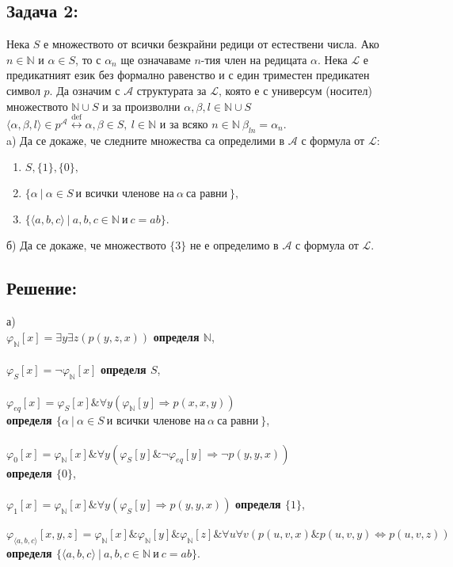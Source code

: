 \documentclass[french]{article}
\begin{document}
\subsection*{{\Large Задача 2:}} 
	{\Large 
	Нека $S$ е множеството от всички безкрайни редици от естествени числа. Ако $n \in \mathbb{N}$ и $\alpha \in S$, то с $\alpha_n$ ще означаваме $n$-тия член на редицата $\alpha$. Нека $\mathcal{L}$ е предикатният език без формално равенство и с един триместен предикатен символ $p$. Да означим с $\mathcal{A}$ структурата за $\mathcal{L}$, която е с универсум (носител) множеството $\mathbb{N} \cup S$ и за произволни $\alpha,\beta, l \in \mathbb{N} \cup S$ \\
	$ \langle \alpha,\beta, l \rangle \in p^{\mathcal{A}} \stackrel{\mathrm{def}}{\longleftrightarrow} \alpha, \beta \in S,\ l \in \mathbb{N} $ и за всяко $ n \in \mathbb{N}\ \beta_{ln} = \alpha_n. $ \\
	a) Да се докаже, че следните множества са определими в $\mathcal{A}$ с формула от $\mathcal{L}$: 
	\begin{enumerate}
		\item $ S, \{1\},\{0\}, $
		\item $ \{\alpha\ |\ \alpha \in S\ \text{и всички членове на}\ \alpha\ \text{са равни}\ \}, $
		\item $ \{ \langle a,b,c \rangle\ |\ a,b,c \in \mathbb{N}\ \text{и}\ c=ab \}. $	
	\end{enumerate}
	б) Да се докаже, че множеството $\{3\}$ не е определимо в $\mathcal{A}$ с
	формула от $\mathcal{L}$.


	\subsection*{{\Large Решение:}}
		а) \\
		$\varphi_{\mathbb{N}}[x] = \exists y \exists z (p(y,z,x))$ \textbf{определя $\mathbb{N}$}, \\
		\\
		$\varphi_S[x] = \neg \varphi_{\mathbb{N}}[x]$ 
		\textbf{определя $S$}, \\
		\\
		$\varphi_{eq}[x] = \varphi_S[x] \& \forall y (\varphi_{\mathbb{N}}[y] \Rightarrow p(x,x,y))$ \\ 
		\textbf{определя $\{\alpha\ |\ \alpha \in S\ \text{и всички членове на}\ \alpha\ \text{са равни}\ \}$}, \\
		\\
		$\varphi_0[x] = \varphi_{\mathbb{N}}[x] \& \forall y (\varphi_S[y] \& \neg \varphi_{eq}[y] \Rightarrow \neg p(y,y,x))$ \\ 
		\textbf{определя $\{0\}$}, \\
		\\
		$\varphi_1[x] = \varphi_{\mathbb{N}}[x] \& \forall y (\varphi_S[y] \Rightarrow p(y,y,x))$ 
		\textbf{определя $\{1\}$}, \\
		\\
		$\varphi_{\langle a,b,c \rangle}[x,y,z] = \varphi_{\mathbb{N}}[x] \& \varphi_{\mathbb{N}}[y] \& \varphi_{\mathbb{N}}[z] \& \forall u \forall v (p(u,v,x) \& p(u,v,y) \Leftrightarrow p(u,v,z))$ \\
		\textbf{определя $\{ \langle a,b,c \rangle\ |\ a,b,c \in \mathbb{N}\ \text{и}\ c=ab \}$}.
	}
\end{document}
